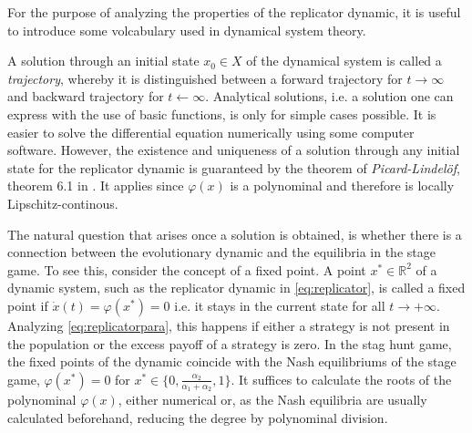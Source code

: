 \documentclass[11pt]{article}
\newcommand{\realnumb}{\mathbb{R}}
\begin{document}
For the purpose of analyzing the properties of the replicator dynamic, it is 
useful to introduce some volcabulary used in dynamical system theory. 

A solution through an initial state $x_0 \in X$ of the dynamical system is called a 
\textit{trajectory}, whereby it is distinguished between a forward trajectory 
for $t \rightarrow \infty$ and backward trajectory for $t \leftarrow \infty$.
Analytical solutions, i.e. a solution one can express with the use of
basic functions, is only for simple cases possible. 
It is easier to solve the differential equation numerically using some
computer software. 
However, the existence and uniqueness of a solution through
any initial state for the replicator dynamic is guaranteed by the theorem 
of \textit{Picard-Lindel\"of}, theorem 6.1 in 
\textcite[74]{weibull_evolutionary_1997}. It applies since $\varphi(x)$ is a 
polynominal and therefore is locally Lipschitz-continous. 

The natural question that arises once a solution is obtained, is whether there 
is a connection between the evolutionary dynamic and the equilibria in the 
stage game. To see this, consider the concept of a fixed point.
A point $x^* \in \realnumb^2$ of a dynamic system, such as the replicator 
dynamic in \eqref{eq:replicator}, is called a fixed point
if $\dot{x}(t) = \varphi(x^*) = 0$ i.e. it stays in the current state for all 
$t \rightarrow + \infty $. 
Analyzing \eqref{eq:replicatorpara}, this happens if either a strategy
is not present in the population or the excess payoff of a strategy is zero. 
In the stag hunt game, the fixed points of the
dynamic coincide with the Nash equilibriums of the stage game, 
$\varphi(x^*) = 0$ for $x^* \in \{0,\frac{\alpha_2}{\alpha_1+\alpha_2},1\}$. 
It suffices to calculate the roots of the polynominal $\varphi(x)$, either
numerical or, as the Nash equilibria are usually calculated beforehand,
reducing the degree by polynominal division.
\end{document}
